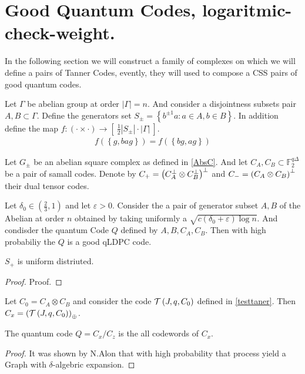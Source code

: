 \section{Good Quantum Codes, logaritmic-check-weight.} 
In the following section we will construct a family of complexes on which we will define a pairs of Tanner Codes, evently, they will used to compose a CSS pairs of good quantum codes.  

\begin{definition} \label{AbsC}
  Let $\Gamma$ be abelian group at order $|\Gamma| = n$. And consider a disjointness subsets pair $A,B \subset \Gamma$. Define the generators set $S_{\pm}  = \left\{ b^{\pm 1} a : a \in A, b \in B   \right\}$. In addition define the map $f : \left( \cdot \times \cdot \right) \rightarrow \left[ \ \frac{1}{2} |S_{\pm}| \cdot |\Gamma|  \ \right]  $. 
\begin{equation*}
  \begin{split}
    f\left( \left\{ g, ba g  \right\}  \right)= f\left( \left\{ bg, ag  \right\}  \right)
  \end{split}
\end{equation*}
\end{definition}

\begin{definition} Let $G_{\pm}$ be an abelian square complex as defined in \ref{AbsC}. And let $C_{A},C_{B} \subset \mathbb{F}_{2}^{q\Delta}$ be a pair of samall codes. Denote by $C_{+} = \left( C_{A}^{\perp}\otimes C_{B}^{\perp} \right)^{\perp}$ and $C_{-} = \left( C_{A}\otimes C_{B}\right)^{\perp} $ their dual tensor codes. 
\end{definition}


\begin{theorem*} 
Let $\delta_{0} \in \left( \frac{2}{3} ,1 \right)$ and let $\varepsilon > 0$. Consider the a pair of generator subset $A,B$ of the Abelian at order $n$ obtained by taking uniformly a $ \sqrt{ c\left( \delta_{0} + \varepsilon \right)\log n }$. And condisder the quantum Code $Q$ defined by $A,B,C_{A},C_{B}$.  Then with high probabiliy the $Q$ is a good qLDPC code.
\end{theorem*}
\begin{claim} \label{unif}
  $S_{+}$ is uniform distriuted. 
\end{claim}
\begin{proof}
  Proof. 
\end{proof}
\begin{claim}
  Let $C_{0} = C_{A}\otimes C_{B}$ and consider the code $\mathcal{T}\left(J, q , C_{0}\right)$ defined in \ref{testtaner}. Then $C_{x} = \left( \mathcal{T}\left(J, q , C_{0}\right) \right)_{\oplus}$. 
\end{claim}
\begin{claim}
  The quantum code $Q = C_{x}/ C_{z}$ is the all \ireducable codewords of $C_{x}$.   
\end{claim}
\begin{proof}
It was shown by N.Alon  that with high probability that process yield a Graph with $\delta$-algebric expansion.
  \end{proof}
